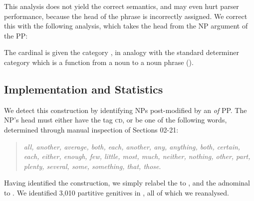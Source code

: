 \documentclass[11pt]{article}
\begin{document}
\begin{center}
\end{center}

This analysis does not yield the correct semantics, and may even hurt parser
performance, because the head of the phrase is incorrectly assigned. We correct
this with the following analysis, which takes the head from the NP argument
of the PP:

\begin{center}
\end{center}

The cardinal is given the category ,  in analogy
with the standard determiner category which is a function from a noun to a noun
phrase ().

\subsection{Implementation and Statistics}

We detect this construction by identifying NPs post-modified by an \emph{of}
PP. The NP's head must either have the \pos tag \textsc{cd}, or be one of the
following words, determined through manual inspection of Sections 02-21:
\vspace{-0.03in}
\begin{quote}
\small
 \emph{all, another, average, both, each, another, any,
anything, both, certain, each, either, enough, few, little, most, much,
neither, nothing, other, part, plenty, several, some, something, that, those}.
\end{quote}
\vspace{-0.03in}
Having identified the construction, we simply relabel the  to ,
and the  adnominal to . We identified 3,010 partitive
genitives in \ccgbank, all of which we reanalysed.
\end{document}
